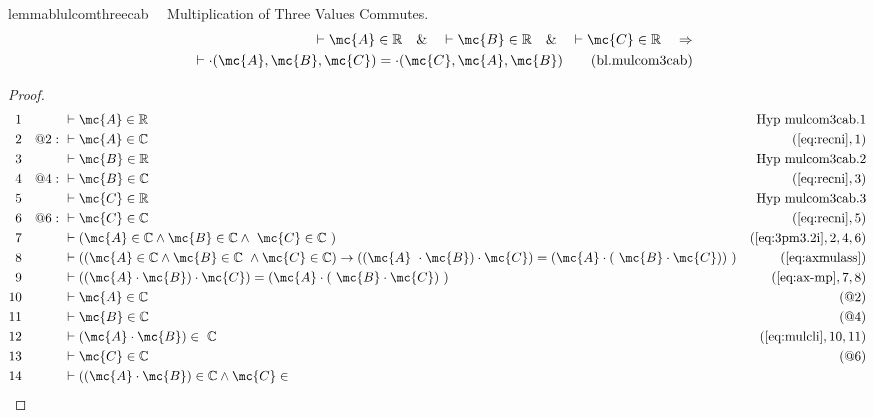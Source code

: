 \begin{restatable}{lemma}{blulcomthreecab}~~ Multiplication of Three Values
Commutes.
\begin{align}
\vdash \mc{A} \in \mathbb{R}\quad\&\quad \vdash \mc{B} \in
    \mathbb{R}\quad\&\quad \vdash \mc{C} \in \mathbb{R}\quad\Rightarrow \notag \\ 
	\quad
    \vdash \cdot( \mc{A} , \mc{B} , \mc{C} ) = \cdot( \mc{C} , \mc{A} , \mc{B}
    )\label{eq:bl.mulcom3cab}\tag{bl.mulcom3cab}
\end{align}
\end{restatable}

\begin{proof}
\begin{align}
  1 &&  & \vdash \mc{A} \in
\mathbb{R}&\text{Hyp~mulcom3cab.1}\notag%
  \\ 2 && @2:\  & \vdash \mc{A} \in \mathbb{C}&(\mbox{\ref{eq:recni}},1)\notag
  \\ 3 &&  & \vdash \mc{B} \in
\mathbb{R}&\text{Hyp~mulcom3cab.2}\notag%
  \\ 4 && @4:\  & \vdash \mc{B} \in \mathbb{C}&(\mbox{\ref{eq:recni}},3)\notag
  \\ 5 &&  & \vdash \mc{C} \in
\mathbb{R}&\text{Hyp~mulcom3cab.3}\notag%
  \\ 6 && @6:\  & \vdash \mc{C} \in \mathbb{C}&(\mbox{\ref{eq:recni}},5)\notag
  \\ 7 &&  & \vdash ( \mc{A} \in \mathbb{C} \wedge \mc{B} \in \mathbb{C} \wedge
     ~\mc{C} \in \mathbb{C}
     ~)&(\mbox{\ref{eq:3pm3.2i}},2,4,6)\notag
  \\ 8 &&  & \vdash ( ( \mc{A} \in \mathbb{C} \wedge \mc{B} \in \mathbb{C}
     ~\wedge \mc{C} \in \mathbb{C} ) \rightarrow ( ( \mc{A}
     ~\cdot \mc{B} ) \cdot \mc{C} ) = ( \mc{A} \cdot (
     ~\mc{B} \cdot \mc{C} ) )
     ~)&(\mbox{\ref{eq:axmulass}})\notag
  \\ 9 &&  & \vdash ( ( \mc{A} \cdot \mc{B} ) \cdot \mc{C} ) = ( \mc{A} \cdot (
     ~\mc{B} \cdot \mc{C} )
     ~)&(\mbox{\ref{eq:ax-mp}},7,8)\notag
  \\ 10 &&  & \vdash \mc{A} \in \mathbb{C}&(@2)\notag
  \\ 11 &&  & \vdash \mc{B} \in \mathbb{C}&(@4)\notag
  \\ 12 &&  & \vdash ( \mc{A} \cdot \mc{B} ) \in
     ~\mathbb{C}&(\mbox{\ref{eq:mulcli}},10,11)\notag
  \\ 13 &&  & \vdash \mc{C} \in \mathbb{C}&(@6)\notag
  \\ 14 &&  & \vdash ( ( \mc{A} \cdot \mc{B} ) \in \mathbb{C} \wedge \mc{C} \in

\end{align}
\end{proof}
